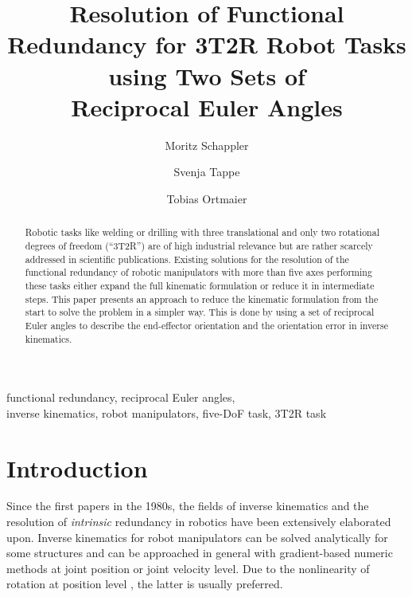 \documentclass{svproc}
\begin{document}
    
\mainmatter              %
%
\title{Resolution of Functional Redundancy for 3T2R Robot Tasks using Two Sets of \\Reciprocal Euler Angles}
%
%
\author{Moritz Schappler \and Svenja Tappe \and Tobias Ortmaier}
%
%
%

\maketitle              %


\begin{abstract}
Robotic tasks like welding or drilling with three translational and only two rotational degrees of freedom (``3T2R'') are of high industrial relevance but are ra\-ther scarcely addressed in scientific publications.
Existing solutions for the resolution of the functional redundancy of robotic manipulators with more than five axes performing these tasks either expand the full kinematic formulation or reduce it in intermediate steps.
This paper presents an approach to reduce the kinematic formulation from the start to solve the problem in a simpler way.
This is done by using a set of reciprocal Euler angles to describe the end-effector orientation and the orientation error in inverse kinematics.
\end{abstract}

\begin{keywords}
functional redundancy, reciprocal Euler angles, \\ inverse kinematics, robot manipulators, five-DoF task, 3T2R task
\end{keywords}

\section{Introduction}
\label{sec:Intro}
Since the first papers in the 1980s, the fields of inverse kinematics \cite{GoldenbergBenFen1985} and the resolution of \emph{intrinsic} redundancy \cite{Yoshikawa1984} in robotics have been extensively elaborated upon.
Inverse kinematics for robot manipulators can be solved analytically for some structures and can be approached in general with gradient-based numeric methods at  joint position or joint velocity level.
Due to the nonlinearity of rotation at position level \cite{GoldenbergBenFen1985}, the latter is usually preferred.
\end{document}
